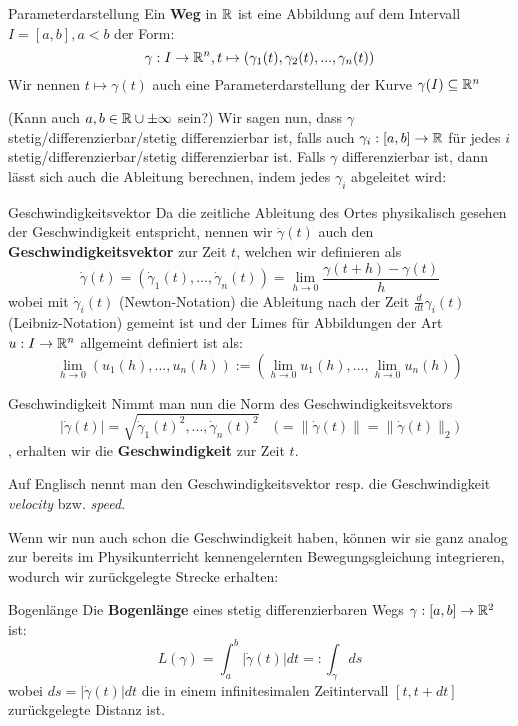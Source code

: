\begin{definition}{Parameterdarstellung}{}
Ein \textbf{Weg} in $\mathbb{R}$ ist eine Abbildung auf dem Intervall $I = [a,b], a<b$ der Form:
$$\gamma: I \to \mathbb{R}^n, t \mapsto (\gamma_1(t), \gamma_2(t),...,\gamma_n(t))$$
Wir nennen $t\mapsto\gamma(t)$ auch eine Parameterdarstellung der Kurve $\gamma(I)\subseteq\mathbb{R}^n$
\end{definition}
(Kann auch $a,b\in \mathbb{R}\cup\pm\infty$ sein?)
Wir sagen nun, dass $\gamma$ stetig/differenzierbar/stetig differenzierbar ist, falls auch $\gamma_i:[a,b] \to \mathbb{R}$ für jedes $i$ stetig/differenzierbar/stetig differenzierbar ist. Falls $\gamma$ differenzierbar ist, dann lässt sich auch die Ableitung berechnen, indem jedes $\gamma_i$ abgeleitet wird:
\begin{definition}{Geschwindigkeitsvektor}{}
Da die zeitliche Ableitung des Ortes physikalisch gesehen der Geschwindigkeit entspricht, nennen wir $\dot{\gamma}(t)$ auch den \textbf{Geschwindigkeitsvektor} zur Zeit $t$, welchen wir definieren als
$$\dot{\gamma}(t) = (\dot{\gamma}_1(t),...,\dot{\gamma}_n(t)) = \lim_{h \to 0} \frac{\gamma(t+h) - \gamma(t)}{h}$$
wobei mit $\dot{\gamma}_i(t)$ (Newton-Notation) die Ableitung nach der Zeit $\frac{d}{dt}\gamma_i(t)$ (Leibniz-Notation) gemeint ist und der Limes für Abbildungen der Art $u: I \to \mathbb{R}^n$ allgemeint definiert ist als:
$$\lim_{h \to 0}(u_1(h),...,u_n(h)) := (\lim_{h \to 0}u_1(h),...,\lim_{h \to 0}u_n(h))$$
\end{definition}
\begin{definition}{Geschwindigkeit}{}
Nimmt man nun die Norm des Geschwindigkeitsvektors
$$|\dot{\gamma}(t)| = \sqrt{\dot{\gamma}_1(t)^2,...,\dot{\gamma}_n(t)^2} \quad \Big(= \|\dot{\gamma}(t)\| = \|\dot{\gamma}(t)\|_2 \Big)$$
, erhalten wir die \textbf{Geschwindigkeit} zur Zeit $t$.
\end{definition}
\begin{remark}
Auf Englisch nennt man den Geschwindigkeitsvektor resp. die Geschwindigkeit \textit{velocity} bzw. \textit{speed}.
\end{remark}
Wenn wir nun auch schon die Geschwindigkeit haben, können wir sie ganz analog zur bereits im Physikunterricht kennengelernten Bewegungsgleichung integrieren, wodurch wir zurückgelegte Strecke erhalten:
\begin{definition}{Bogenlänge}{}
Die \textbf{Bogenlänge} eines stetig differenzierbaren Wegs $\gamma: [a,b] \to \mathbb{R}^2$ ist:
$$L(\gamma) = \int_a^b |\dot{\gamma}(t)| dt =: \int_\gamma ds$$
wobei $ds = |\dot{\gamma}(t)| dt$ die in einem infinitesimalen Zeitintervall $[t,t+dt]$ zurückgelegte Distanz ist.
\end{definition}
